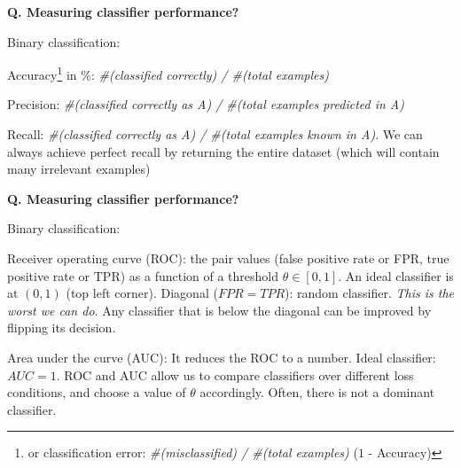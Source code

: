 \begin{frame}[fragile]{\textbf{Q. Measuring classifier performance?}}
  \begin{wideitemize}
  \item Binary classification:\medskip
    \begin{wideitemize}
    \item Accuracy\footnote{or classification error: \textit{\#(misclassified) /
          \#(total examples)} ($1$ - Accuracy)} in \%: \textit{\#(classified correctly) / \#(total examples)}
    \item Precision: \textit{\#(classified correctly as A) / \#(total examples
        predicted in A)}
    \item Recall: \textit{\#(classified correctly as A) / \#(total examples
        known in A)}. {\footnotesize We can always achieve perfect recall by
        returning the entire dataset (which will contain many irrelevant examples)}
    \end{wideitemize}
  \end{wideitemize}
\end{frame}



\begin{frame}[fragile]{\textbf{Q. Measuring classifier performance?}}
  \begin{wideitemize}
  \item Binary classification:\medskip
    \begin{wideitemize}
    \item Receiver operating curve (ROC): the pair values (false positive rate
      or FPR, true positive rate or TPR) as a function of a threshold $\theta \in [0, 1]$.
      {\footnotesize An ideal classifier is at $(0, 1)$ (top left corner). Diagonal ($FPR
        = TPR$): random classifier. \textit{This is the worst we can do}.}
      {\scriptsize Any classifier that is below the diagonal can be improved by flipping its decision.}
    \item Area under the curve (AUC): It reduces the ROC to a number. Ideal
      classifier: $AUC = 1$. {\footnotesize ROC and AUC allow us to compare
        classifiers over different loss conditions, and choose a value of
        $\theta$ accordingly. Often, there is not a dominant classifier.}
    \end{wideitemize}
  \end{wideitemize}
\end{frame}

